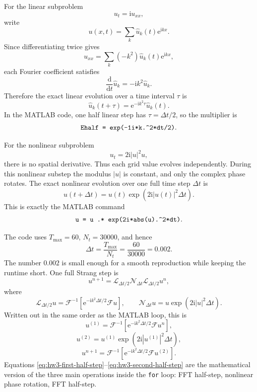 \documentclass{amsart}
\newcounter{hw}
\numberwithin{equation}{hw}
\begin{document}
For the linear subproblem
\[
u_t=\mathrm{i}u_{xx},
\]
write
\[
u(x,t)=\sum_k \widehat{u}_k(t)\mathrm{e}^{\mathrm{i}kx}.
\]
Since differentiating twice gives
\[
u_{xx}
=
\sum_k (-k^2)\widehat{u}_k(t)\mathrm{e}^{\mathrm{i}kx},
\]
each Fourier coefficient satisfies
\[
\frac{\mathrm{d}}{\mathrm{d}t}\widehat{u}_k
=
-\mathrm{i}k^2\widehat{u}_k.
\]
Therefore the exact linear evolution over a time interval \(\tau\) is
\begin{equation}
\widehat{u}_k(t+\tau)
=
\mathrm{e}^{-\mathrm{i}k^2\tau}\widehat{u}_k(t).
\label{eq:hw3-linear-fourier-flow}
\end{equation}
In the MATLAB code, one half linear step has \(\tau=\Delta t/2\), so the
multiplier is
\[
\texttt{Ehalf = exp(-1i*k.\string^2*dt/2)}.
\]

For the nonlinear subproblem
\[
u_t=2\mathrm{i}|u|^2u,
\]
there is no spatial derivative.  Thus each grid value evolves
independently.  During this nonlinear substep the modulus \(|u|\) is
constant, and only the complex phase rotates.  The exact nonlinear
evolution over one full time step \(\Delta t\) is
\begin{equation}
u(t+\Delta t)
=
u(t)\exp\!\left(2\mathrm{i}|u(t)|^2\Delta t\right).
\label{eq:hw3-nonlinear-flow}
\end{equation}
This is exactly the MATLAB command
\[
\texttt{u = u .* exp(2i*abs(u).\string^2*dt)}.
\]

The code uses \(T_{\max}=60\), \(N_t=30000\), and hence
\begin{equation}
\Delta t=\frac{T_{\max}}{N_t}
=
\frac{60}{30000}
=
0.002.
\label{eq:hw3-time-step}
\end{equation}
The number \(0.002\) is small enough for a smooth reproduction while
keeping the runtime short.  One full Strang step is
\begin{equation}
u^{n+1}
=
\mathcal{L}_{\Delta t/2}
\mathcal{N}_{\Delta t}
\mathcal{L}_{\Delta t/2}u^n,
\label{eq:hw3-strang-compact}
\end{equation}
where
\[
\mathcal{L}_{\Delta t/2}u
=
\mathcal{F}^{-1}
\left[
\mathrm{e}^{-\mathrm{i}k^2\Delta t/2}\mathcal{F}u
\right],
\qquad
\mathcal{N}_{\Delta t}u
=
u\exp(2\mathrm{i}|u|^2\Delta t).
\]
Written out in the same order as the MATLAB loop, this is
\begin{equation}
u^{(1)}
=
\mathcal{F}^{-1}
\left[
\mathrm{e}^{-\mathrm{i}k^2\Delta t/2}
\mathcal{F}u^n
\right],
\label{eq:hw3-first-half-step}
\end{equation}
\begin{equation}
u^{(2)}
=
u^{(1)}
\exp\!\left(2\mathrm{i}|u^{(1)}|^2\Delta t\right),
\label{eq:hw3-nonlinear-step-written}
\end{equation}
\begin{equation}
u^{n+1}
=
\mathcal{F}^{-1}
\left[
\mathrm{e}^{-\mathrm{i}k^2\Delta t/2}
\mathcal{F}u^{(2)}
\right].
\label{eq:hw3-second-half-step}
\end{equation}
Equations \eqref{eq:hw3-first-half-step}--\eqref{eq:hw3-second-half-step}
are the mathematical version of the three main operations inside the
\texttt{for} loop: FFT half-step, nonlinear phase rotation, FFT
half-step.
\end{document}

